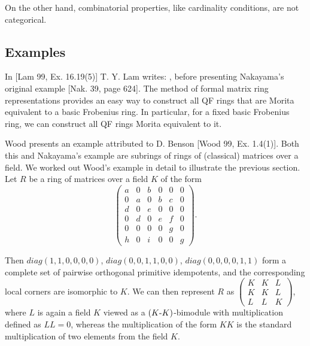 \documentclass[11pt]{article}
\theoremstyle{plain}
\theoremstyle{remark}
\theoremstyle{plain}
\begin{document}
 On the other hand, combinatorial properties, like cardinality conditions, are not categorical. 
 
\subsection{Examples}\label{secsempex}




 In [Lam 99, Ex. 16.19(5)] T. Y. Lam writes: , before presenting Nakayama's original example [Nak. 39, page 624]. The method of formal matrix ring representations provides an easy way to construct all QF rings that are Morita equivalent to a basic Frobenius ring. In particular, for a fixed basic Frobenius ring, we can construct all QF rings Morita equivalent to it. 

 \smallskip 


Wood presents an example attributed to D. Benson [Wood 99, Ex. 1.4(1)]. Both this and Nakayama's example are subrings of rings of (classical) matrices over a field.  We worked out Wood's example in detail to illustrate the previous section. Let $R$ be a ring of matrices over a field $K$ of the form
\[
\left(
\begin{array}{cc|cc|cc}
     a&0 & b&0&0&0\\
     0&a & 0&b&c&0\\
     \hline
     d&0 & e&0&0&0\\
     0&d & 0&e&f&0\\
     \hline
     0&0 & 0&0&g&0\\
     h&0 & i&0&0&g
\end{array}
\right).
\]
 
 Then $diag(1,1,0,0,0,0)$, $diag(0,0,1,1,0,0)$, $diag(0,0,0,0,1,1)$ form a complete set of pairwise orthogonal primitive idempotents, and the corresponding local corners are isomorphic to $K$. We can then represent $R$ as $\left(
\begin{array}{cc|c}
  K&K&L\\
     K&K&L\\
  \hline
 L&L&K
\end{array}
\right)$, where $L$ is again a field $K$ viewed as a $(K\text-K)$-bimodule with multiplication defined as $LL=0$, whereas the multiplication of the form $KK$ is the standard multiplication of two elements from the field $K$.
\end{document}
